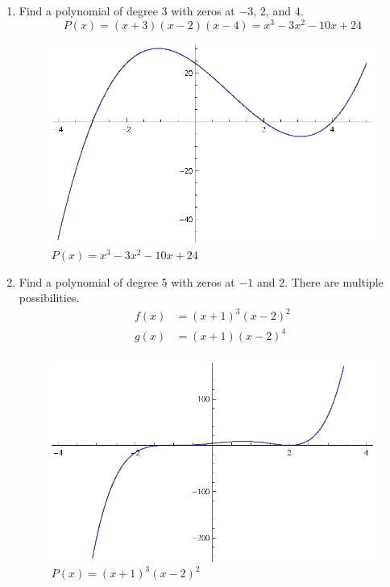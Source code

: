 \documentclass{exam}
\begin{document}
  \begin{enumerate}
    \item Find a polynomial of degree 3 with zeros at $-3$, $2$, and $4$.
      \[
        P(x) = (x + 3)(x - 2)(x - 4) = x^3 - 3x^2 - 10x + 24
      \]
      
      \begin{figure}[H]
        \centering
        \includegraphics[scale=0.9]{graph1.eps}
        \caption*{$P(x) = x^3 - 3x^2 - 10x + 24$}
      \end{figure}

    \item Find a polynomial of degree 5 with zeros at $-1$ and $2$.  There are multiple possibilities.
      \begin{align*}
        f(x) &= (x + 1)^3(x - 2)^2 \\
        g(x) &= (x + 1)(x - 2)^4 \\
      \end{align*}
      
      \begin{figure}[H]
        \centering
        \includegraphics[scale=0.9]{graph2.eps}
        \caption*{$P(x) = (x + 1)^3(x - 2)^2$}
      \end{figure}


\end{enumerate}
\end{document}
